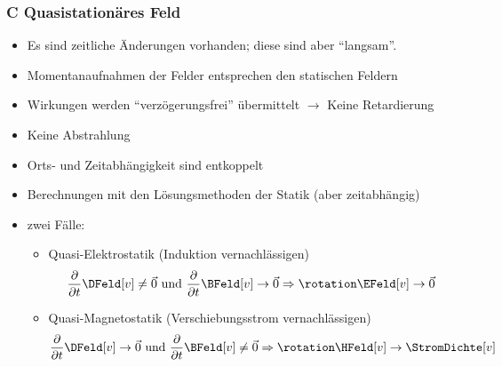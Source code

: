 \begin{frame}
  \frametitle{C Quasistationäres Feld}

  \begin{itemize}[<+->]
    \item Es sind zeitliche Änderungen vorhanden; diese sind aber
      \enquote{langsam}.
      \item Momentanaufnahmen der Felder entsprechen den statischen
        Feldern
        \item Wirkungen werden \enquote{verzögerungsfrei} übermittelt
          $\to$ Keine \alert{Retardierung}
        \item Keine Abstrahlung
        \item Orts- und Zeitabhängigkeit sind entkoppelt
          \item Berechnungen mit den Lösungsmethoden der Statik (aber zeitabhängig)
          \item zwei Fälle:
            \begin{itemize}[<+->]
            \item Quasi-Elektrostatik (Induktion vernachlässigen)
              $$
              \dfrac{\partial}{\partial t} \DFeld[v] \neq \vec{0}
              \text{ und } \dfrac{\partial}{\partial t} \BFeld[v] \to \vec{0}
              \Rightarrow \rotation\EFeld[v] \to \vec{0}
              $$
              \item Quasi-Magnetostatik (Verschiebungsstrom vernachlässigen)
              $$
              \dfrac{\partial}{\partial t} \DFeld[v] \to \vec{0}
              \text{ und } \dfrac{\partial}{\partial t} \BFeld[v] \neq \vec{0}
              \Rightarrow \rotation\HFeld[v] \to \StromDichte[v]
              $$
              \end{itemize}

    \end{itemize}
\end{frame}


